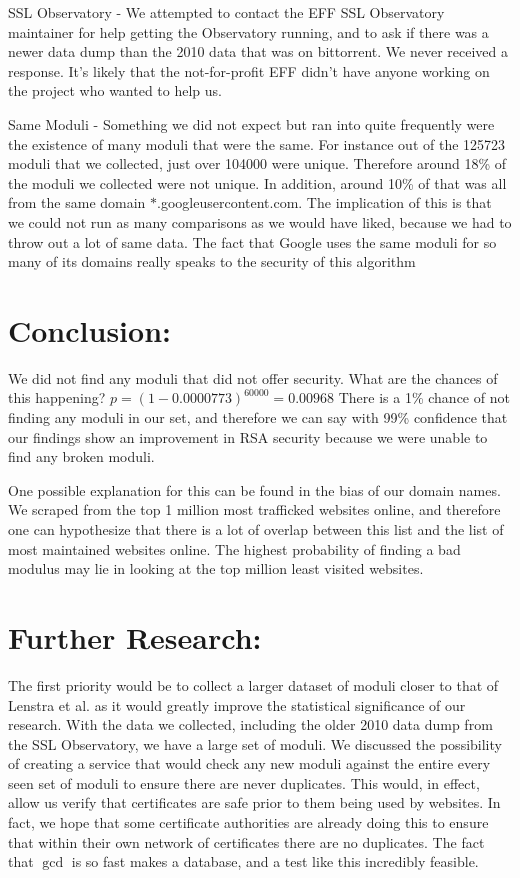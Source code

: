 \documentclass[11pt,twoside]{article}
\begin{document}
\begin{multicols}{2}
SSL Observatory - We attempted to contact the EFF SSL Observatory maintainer
for help getting the Observatory running, and to ask if there was a newer data
dump than the 2010 data that was on bittorrent. We never received a response.
It's likely that the not-for-profit EFF didn't have anyone working on the
project who wanted to help us.

Same Moduli - Something we did not expect but ran into quite frequently were the
existence of many moduli that were the same. For instance out of the 125723
moduli that we collected, just over 104000 were unique. Therefore around 18\% of
the moduli we collected were not unique. In addition, around 10\% of that was
all from the same domain $*$.googleusercontent.com. The implication of this is
that we could not run as many comparisons as we would have liked, because we
had to throw out a lot of same data. The fact that Google uses the same moduli
for so many of its domains really speaks to the security of this algorithm

\section{Conclusion:}
We did not find any moduli that did not offer security. What are the chances of
this happening?  $p = (1-0.0000773)^{60000} = 0.00968$
There is a 1\% chance of not finding any moduli in our set, and therefore we can
say with 99\% confidence that our findings show an improvement in RSA security
because we were unable to find any broken moduli.

One possible explanation for this can be found in the bias of our domain names.
We scraped from the top 1 million most trafficked websites online, and therefore
one can hypothesize that there is a lot of overlap between this list and the
list of most maintained websites online. The highest probability of finding a
bad modulus may lie in looking at the top million least visited websites. 


\section{Further Research:}
The first priority would be to collect a larger dataset of moduli closer to that
of Lenstra et al. as it would greatly improve the statistical significance of
our research. With the data we collected, including the older 2010 data dump 
from the SSL Observatory, we have a large set of moduli. We discussed the 
possibility of creating a service that would check any new moduli against the 
entire every seen set of moduli to ensure there are never duplicates. This 
would, in effect, allow us verify that certificates are safe prior to them being
used by websites. In fact, we hope that some certificate authorities are already
doing this to ensure that within their own network of certificates there are no
duplicates. The fact that $\gcd$ is so fast makes a database, and a test like
this incredibly feasible.

\end{multicols}
\end{document}
